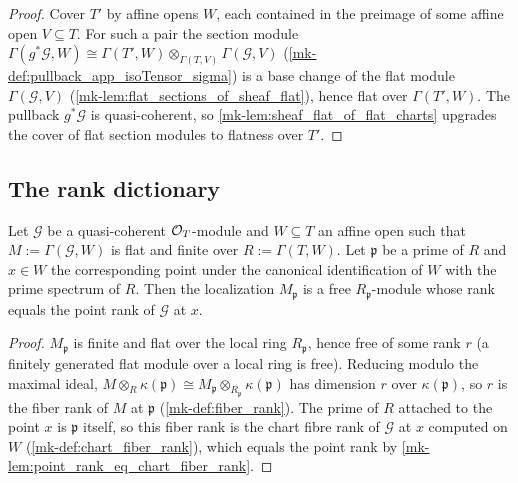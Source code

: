 \begin{proof}
  \leanok
  Cover \(T'\) by affine opens \(W\), each contained in the preimage of some
  affine open \(V \subseteq T\).  For such a pair the section module
  \(\Gamma(g^*\mathcal G, W) \cong
    \Gamma(T', W) \otimes_{\Gamma(T, V)} \Gamma(\mathcal G, V)\)
  (\ref{mk-def:pullback_app_isoTensor_sigma}) is a base change of the flat
  module \(\Gamma(\mathcal G, V)\) (\ref{mk-lem:flat_sections_of_sheaf_flat}),
  hence flat over \(\Gamma(T', W)\).  The pullback \(g^*\mathcal G\) is
  quasi-coherent, so \ref{mk-lem:sheaf_flat_of_flat_charts} upgrades the cover
  of flat section modules to flatness over \(T'\).
\end{proof}

\subsection{The rank dictionary}

\begin{theorem}
  \label{mk-thm:stalk_rank_eq_point_rank}
  \leanok

  Let \(\mathcal G\) be a quasi-coherent \(\mathcal{O}_T\)-module and
  \(W \subseteq T\) an affine open such that \(M := \Gamma(\mathcal G, W)\)
  is flat and finite over \(R := \Gamma(T, W)\).  Let \(\mathfrak p\) be a
  prime of \(R\) and \(x \in W\) the corresponding point under the canonical
  identification of \(W\) with the prime spectrum of \(R\).  Then the
  localization \(M_{\mathfrak p}\) is a free \(R_{\mathfrak p}\)-module
  whose rank equals the point rank of \(\mathcal G\) at \(x\).
\end{theorem}

\begin{proof}
  \leanok
  \(M_{\mathfrak p}\) is finite and flat over the local ring
  \(R_{\mathfrak p}\), hence free of some rank \(r\) (a finitely generated
  flat module over a local ring is free).  Reducing modulo the maximal
  ideal,
  \(M \otimes_R \kappa(\mathfrak p)
    \cong M_{\mathfrak p} \otimes_{R_{\mathfrak p}} \kappa(\mathfrak p)\)
  has dimension \(r\) over \(\kappa(\mathfrak p)\), so \(r\) is the fiber
  rank of \(M\) at \(\mathfrak p\) (\ref{mk-def:fiber_rank}).  The prime of
  \(R\) attached to the point \(x\) is \(\mathfrak p\) itself, so this fiber
  rank is the chart fibre rank of \(\mathcal G\) at \(x\) computed on \(W\)
  (\ref{mk-def:chart_fiber_rank}), which equals the point rank by
  \ref{mk-lem:point_rank_eq_chart_fiber_rank}.
\end{proof}


